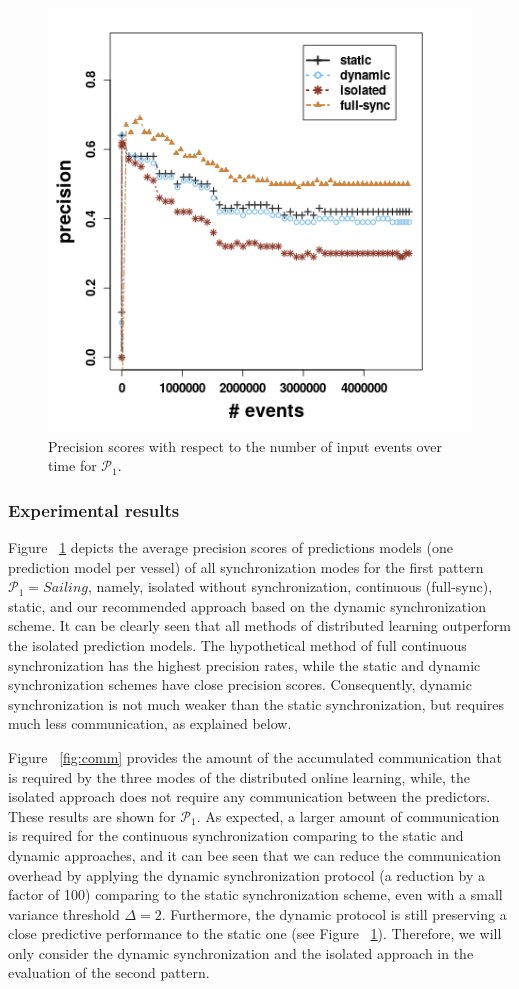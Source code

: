 \begin{figure}[h]
	
	\includegraphics[width=.5\textwidth]{figures/precision_p1.png}
	
	\caption{Precision scores with respect to the number of input events over time for $\mathcal{P}_1$.}
	\label{fig:precsions}
\end{figure}

\subsubsection*{Experimental results} Figure ~\ref{fig:precsions} depicts the average precision scores of predictions models (one prediction model per vessel) of all synchronization modes for the first pattern $\mathcal{P}_1=Sailing$, namely, isolated without synchronization, continuous (full-sync), static, and our recommended approach based on the dynamic synchronization scheme. It can be clearly seen that all methods of distributed learning outperform the isolated prediction models. The hypothetical method of full continuous synchronization has the highest precision rates, while the static and dynamic synchronization schemes have close precision scores. Consequently, dynamic synchronization is not much weaker than the static synchronization, but requires much less communication, as explained below.
 

 
\par Figure ~\ref{fig:comm} provides the amount of the accumulated communication that is required by the three modes of the distributed online learning, while, the isolated approach does not require any communication between the predictors. These results are shown  for $\mathcal{P}_1$.  As expected, a larger amount of communication is required for the continuous synchronization comparing to the static and dynamic approaches, and it can bee seen that we can reduce the communication overhead by applying the dynamic synchronization protocol (a reduction by a factor of 100) comparing to the static synchronization scheme, even with a small variance threshold $\Delta=2$. Furthermore,  the dynamic  protocol is still preserving a close predictive performance to the static one (see Figure ~\ref{fig:precsions}).  Therefore, we will only consider the dynamic synchronization and the isolated approach in the  evaluation of the second pattern.

